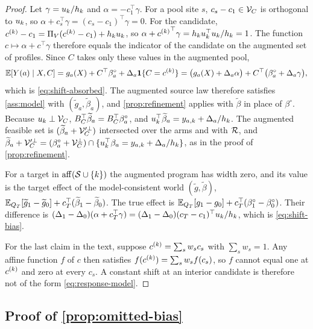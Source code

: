 \begin{proof}
Let $\gamma=u_{k}/h_k$ and $\alpha=-c_1^\top\gamma$. For a pool
site $s$, $c_s-c_1\in\mathcal V_C$ is orthogonal to $u_{k}$, so
$\alpha+c_s^\top\gamma=(c_s-c_1)^\top\gamma=0$. For the candidate,
$c^{(k)}-c_1=\Pi_V(c^{(k)}-c_1)+h_ku_{k}$, so
$\alpha+{c^{(k)}}^\top\gamma=h_ku_{k}^\top u_{k}/h_k=1$. The
function $c\mapsto\alpha+c^\top\gamma$ therefore equals the indicator of
the candidate on the augmented set of profiles. Since $C$ takes only
these values in the augmented pool,
\[
  \mathbb{E}[Y(a)\mid X,C]
  =g_a(X)+C^\top\beta_a^\circ+\Delta_a\mathbf{1}\{C=c^{(k)}\}
  =\bigl(g_a(X)+\Delta_a\alpha\bigr)+C^\top\bigl(\beta_a^\circ+\Delta_a\gamma\bigr),
\]
which is \eqref{eq:shift-absorbed}. The augmented source law therefore
satisfies \cref{ass:model} with $(\widetilde g_a,\widetilde\beta_a)$, and
\cref{prop:refinement} applies with $\widetilde\beta$ in place of
$\beta^\circ$. Because $u_{k}\perp\mathcal V_C$,
$B_C^\top\widetilde\beta_a=B_C^\top\beta_a^\circ$, and
$u_{k}^\top\widetilde\beta_a=y_{a,k}+\Delta_a/h_k$. The
augmented feasible set is
$(\widetilde\beta_a+\mathcal V_C'^\perp)$ intersected over the arms and with
$\mathcal R$, and $\widetilde\beta_a+\mathcal V_C'^\perp
=(\beta_a^\circ+\mathcal V_C^\perp)\cap\{u_{k}^\top\beta_a
=y_{a,k}+\Delta_a/h_k\}$, as in the proof of
\cref{prop:refinement}.

For a target in $\operatorname{aff}(\mathcal S\cup\{k\})$ the augmented program has
width zero, and its value is the target effect of the model-consistent
world $(\widetilde g,\widetilde\beta)$,
$\mathbb{E}_{Q_T}[\widetilde g_1-\widetilde g_0]+c_T^\top(\widetilde\beta_1-\widetilde\beta_0)$.
The true effect is $\mathbb{E}_{Q_T}[g_1-g_0]+c_T^\top(\beta_1^\circ-\beta_0^\circ)$.
Their difference is
$(\Delta_1-\Delta_0)(\alpha+c_T^\top\gamma)
=(\Delta_1-\Delta_0)(c_T-c_1)^\top u_{k}/h_k$, which is
\eqref{eq:shift-bias}.

For the last claim in the text, suppose $c^{(k)}=\sum_sw_sc_s$ with
$\sum_sw_s=1$. Any affine function $f$ of $c$ then satisfies
$f(c^{(k)})=\sum_sw_sf(c_s)$, so $f$ cannot equal one at $c^{(k)}$ and
zero at every $c_s$. A constant shift at an interior candidate is
therefore not of the form \eqref{eq:response-model}.
\end{proof}

\subsection{Proof of \texorpdfstring{\cref{prop:omitted-bias}}{Proposition on omitted-moderator bias}}
\label{app:proof-omitted-bias}

